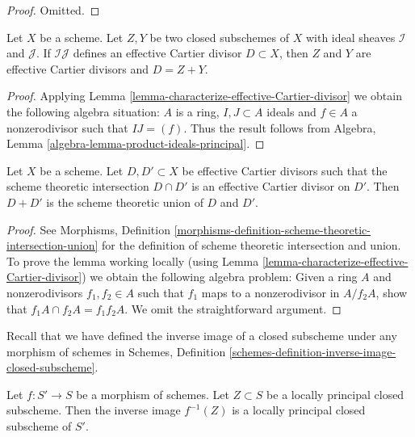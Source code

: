 \begin{proof}
Omitted.
\end{proof}

\begin{lemma}
\label{lemma-sum-closed-subschemes-effective-Cartier}
Let $X$ be a scheme. Let $Z, Y$ be two closed subschemes of $X$
with ideal sheaves $\mathcal{I}$ and $\mathcal{J}$. If $\mathcal{I}\mathcal{J}$
defines an effective Cartier divisor $D \subset X$, then $Z$ and $Y$
are effective Cartier divisors and $D = Z + Y$.
\end{lemma}

\begin{proof}
Applying Lemma \ref{lemma-characterize-effective-Cartier-divisor} we obtain
the following algebra situation: $A$ is a ring, $I, J \subset A$
ideals and $f \in A$ a nonzerodivisor such that $IJ = (f)$.
Thus the result follows from
Algebra, Lemma \ref{algebra-lemma-product-ideals-principal}.
\end{proof}

\begin{lemma}
\label{lemma-sum-effective-Cartier-divisors-union}
Let $X$ be a scheme. Let $D, D' \subset X$ be effective Cartier divisors
such that the scheme theoretic intersection $D \cap D'$ is an effective
Cartier divisor on $D'$. Then $D + D'$ is the scheme theoretic
union of $D$ and $D'$.
\end{lemma}

\begin{proof}
See Morphisms, Definition
\ref{morphisms-definition-scheme-theoretic-intersection-union}
for the definition of scheme theoretic intersection and union.
To prove the lemma working locally
(using Lemma \ref{lemma-characterize-effective-Cartier-divisor})
we obtain the following algebra problem: Given a ring $A$
and nonzerodivisors $f_1, f_2 \in A$ such that $f_1$ maps
to a nonzerodivisor in $A/f_2A$, show that $f_1A \cap f_2A = f_1f_2A$.
We omit the straightforward argument.
\end{proof}

\noindent
Recall that we have defined the inverse image of a closed subscheme
under any morphism of schemes in
Schemes, Definition \ref{schemes-definition-inverse-image-closed-subscheme}.

\begin{lemma}
\label{lemma-pullback-locally-principal}
Let $f : S' \to S$ be a morphism of schemes. Let $Z \subset S$
be a locally principal closed subscheme. Then the inverse image
$f^{-1}(Z)$ is a locally principal closed subscheme of $S'$.
\end{lemma}


